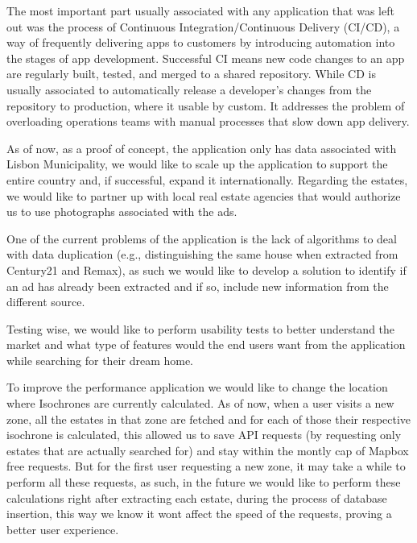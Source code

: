 The most important part usually associated with any application that was left out was the process of Continuous Integration/Continuous Delivery (CI/CD), a way of frequently delivering apps to customers by introducing automation into the stages of app development. Successful CI means new code changes to an app are regularly built, tested, and merged to a shared repository. 
While CD is usually associated to automatically release a developer's changes from the repository to production, where it usable by custom. It addresses the problem of overloading operations teams with manual processes that slow down app delivery.

As of now, as a proof of concept, the application only has data associated with Lisbon Municipality, we would like to scale up the application to support the entire country and, if successful, expand it internationally. Regarding the estates, we would like to partner up with local real estate agencies that would authorize us to use photographs associated with the ads.

One of the current problems of the application is the lack of algorithms to deal with data duplication (e.g., distinguishing the same house when extracted from Century21 and Remax), as such we would like to develop a solution to identify if an ad has already been extracted and if so, include new information from the different source.

Testing wise, we would like to perform usability tests to better understand the market and what type of features would the end users want from the application while searching for their dream home.

To improve the performance application we would like to change the location where Isochrones are currently calculated. As of now, when a user visits a new zone, all the estates in that zone are fetched and for each of those their respective isochrone is calculated, this allowed us to save API requests (by requesting only estates that are actually searched for) and stay within the montly cap of Mapbox free requests. But for the first user requesting a new zone, it may take a while to perform all these requests, as such, in the future we would like to perform these calculations right after extracting each estate, during the process of database insertion, this way we know it wont affect the speed of the requests, proving a better user experience.